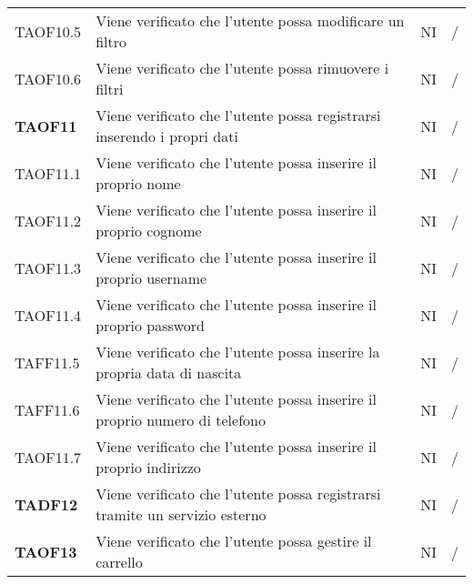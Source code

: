 \begin{center}
\begin{longtable}[!h]{p{60px} p{240px} p{35px} p{35px}}
        TAOF10.5        & Viene verificato che l'utente possa modificare un filtro                                                            & NI              & /              \\
        TAOF10.6        & Viene verificato che l'utente possa rimuovere i filtri                                                              & NI              & /              \\
        \textbf{TAOF11} & Viene verificato che l'utente possa registrarsi inserendo i propri dati                                            & NI              & /              \\
        TAOF11.1        & Viene verificato che l'utente possa inserire il proprio nome                                                        & NI              & /              \\
        TAOF11.2        & Viene verificato che l'utente possa inserire il proprio cognome                                                     & NI              & /              \\
        TAOF11.3        & Viene verificato che l'utente possa inserire il proprio username                                                    & NI              & /              \\
        TAOF11.4        & Viene verificato che l'utente possa inserire il proprio password                                                    & NI              & /              \\
        TAFF11.5        & Viene verificato che l'utente possa inserire la propria data di nascita                                             & NI              & /              \\
        TAFF11.6        & Viene verificato che l'utente possa inserire il proprio numero di telefono                                          & NI              & /              \\
        TAOF11.7        & Viene verificato che l'utente possa inserire il proprio indirizzo                                                   & NI              & /              \\
        \textbf{TADF12} & Viene verificato che l'utente possa registrarsi tramite un servizio esterno                                        & NI             & /              \\
        \textbf{TAOF13} & Viene verificato che l'utente possa gestire il carrello                                                             & NI              & /              \\

\end{longtable}
\end{center}
